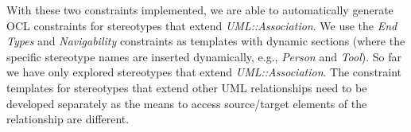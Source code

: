 \begin{figure}[h]
	
	
	\vspace*{-5mm}
\end{figure}

With these two constraints implemented, we are able to automatically generate 
OCL constraints for stereotypes that extend \emph{UML::Association}. We use the 
\emph{End Types} and \emph{Navigability} constraints as templates with dynamic 
sections (where the specific stereotype names are inserted dynamically, e.g., 
\emph{Person} and \emph{Tool}). So far we have only explored stereotypes that 
extend \emph{UML::Association}. The constraint templates for stereotypes that 
extend other UML relationships need to be developed separately as the means to 
access source/target elements of the relationship are different.


